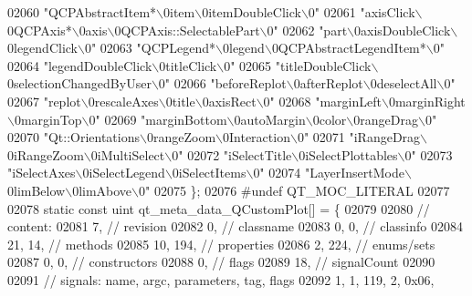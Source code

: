 \begin{DoxyCode}
02060     \textcolor{stringliteral}{"QCPAbstractItem*\(\backslash\)0item\(\backslash\)0itemDoubleClick\(\backslash\)0"}
02061     \textcolor{stringliteral}{"axisClick\(\backslash\)0QCPAxis*\(\backslash\)0axis\(\backslash\)0QCPAxis::SelectablePart\(\backslash\)0"}
02062     \textcolor{stringliteral}{"part\(\backslash\)0axisDoubleClick\(\backslash\)0legendClick\(\backslash\)0"}
02063     \textcolor{stringliteral}{"QCPLegend*\(\backslash\)0legend\(\backslash\)0QCPAbstractLegendItem*\(\backslash\)0"}
02064     \textcolor{stringliteral}{"legendDoubleClick\(\backslash\)0titleClick\(\backslash\)0"}
02065     \textcolor{stringliteral}{"titleDoubleClick\(\backslash\)0selectionChangedByUser\(\backslash\)0"}
02066     \textcolor{stringliteral}{"beforeReplot\(\backslash\)0afterReplot\(\backslash\)0deselectAll\(\backslash\)0"}
02067     \textcolor{stringliteral}{"replot\(\backslash\)0rescaleAxes\(\backslash\)0title\(\backslash\)0axisRect\(\backslash\)0"}
02068     \textcolor{stringliteral}{"marginLeft\(\backslash\)0marginRight\(\backslash\)0marginTop\(\backslash\)0"}
02069     \textcolor{stringliteral}{"marginBottom\(\backslash\)0autoMargin\(\backslash\)0color\(\backslash\)0rangeDrag\(\backslash\)0"}
02070     \textcolor{stringliteral}{"Qt::Orientations\(\backslash\)0rangeZoom\(\backslash\)0Interaction\(\backslash\)0"}
02071     \textcolor{stringliteral}{"iRangeDrag\(\backslash\)0iRangeZoom\(\backslash\)0iMultiSelect\(\backslash\)0"}
02072     \textcolor{stringliteral}{"iSelectTitle\(\backslash\)0iSelectPlottables\(\backslash\)0"}
02073     \textcolor{stringliteral}{"iSelectAxes\(\backslash\)0iSelectLegend\(\backslash\)0iSelectItems\(\backslash\)0"}
02074     \textcolor{stringliteral}{"LayerInsertMode\(\backslash\)0limBelow\(\backslash\)0limAbove\(\backslash\)0"}
02075 \};
02076 \textcolor{preprocessor}{#undef QT\_MOC\_LITERAL}
02077 
02078 \textcolor{keyword}{static} \textcolor{keyword}{const} uint qt\_meta\_data\_QCustomPlot[] = \{
02079 
02080  \textcolor{comment}{// content:}
02081        7,       \textcolor{comment}{// revision}
02082        0,       \textcolor{comment}{// classname}
02083        0,    0, \textcolor{comment}{// classinfo}
02084       21,   14, \textcolor{comment}{// methods}
02085       10,  194, \textcolor{comment}{// properties}
02086        2,  224, \textcolor{comment}{// enums/sets}
02087        0,    0, \textcolor{comment}{// constructors}
02088        0,       \textcolor{comment}{// flags}
02089       18,       \textcolor{comment}{// signalCount}
02090 
02091  \textcolor{comment}{// signals: name, argc, parameters, tag, flags}
02092        1,    1,  119,    2, 0x06,

\end{DoxyCode}
